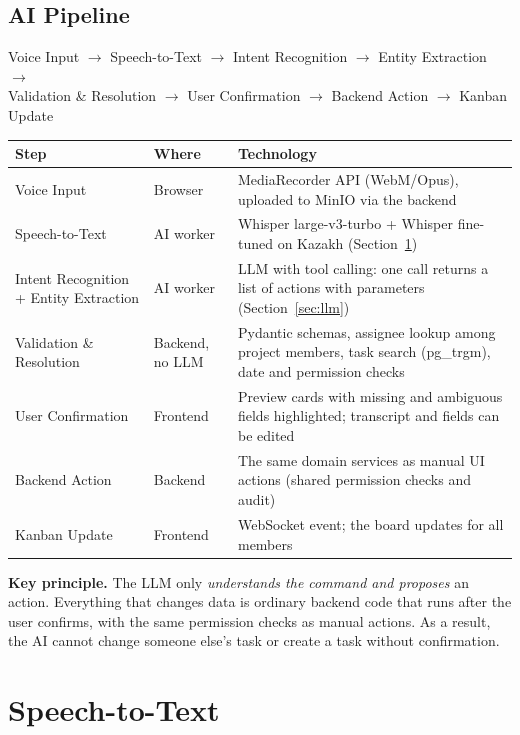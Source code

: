 \documentclass[11pt,a4paper]{article}
\newcommand{\tblstart}{\small\rowcolors{2}{gray!7}{white}}
\begin{document}
\subsection{AI Pipeline}

\begin{center}
\small
Voice Input $\rightarrow$ Speech-to-Text $\rightarrow$ Intent Recognition $\rightarrow$ Entity Extraction $\rightarrow$\\
Validation \& Resolution $\rightarrow$ User Confirmation $\rightarrow$ Backend Action $\rightarrow$ Kanban Update
\end{center}

{\tblstart
\begin{xltabular}{\textwidth}{P{3.4cm} P{2.6cm} L}
\toprule
\textbf{Step} & \textbf{Where} & \textbf{Technology} \\
\midrule
\endhead
Voice Input & Browser & MediaRecorder API (WebM/Opus), uploaded to MinIO via the backend \\
Speech-to-Text & AI worker & Whisper large-v3-turbo + Whisper fine-tuned on Kazakh (Section~\ref{sec:stt}) \\
Intent Recognition + Entity Extraction & AI worker & LLM with tool calling: one call returns a list of actions with parameters (Section~\ref{sec:llm}) \\
Validation \& Resolution & Backend, no LLM & Pydantic schemas, assignee lookup among project members, task search (pg\_trgm), date and permission checks \\
User Confirmation & Frontend & Preview cards with missing and ambiguous fields highlighted; transcript and fields can be edited \\
Backend Action & Backend & The same domain services as manual UI actions (shared permission checks and audit) \\
Kanban Update & Frontend & WebSocket event; the board updates for all members \\
\bottomrule
\end{xltabular}}

\textbf{Key principle.} The LLM only \emph{understands the command and proposes} an action. Everything that changes data is ordinary backend code that runs after the user confirms, with the same permission checks as manual actions. As a result, the AI cannot change someone else's task or create a task without confirmation.

\section{Speech-to-Text}\label{sec:stt}
\end{document}
